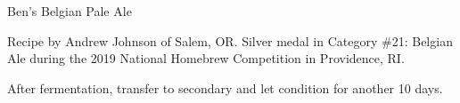 \stylesection{\stylebelgianpaleale}

\begin{recipe}{Ben's Belgian Pale Ale}

\begin{aboutblock}
Recipe by Andrew Johnson of Salem, OR. Silver medal in Category \#21: Belgian
Ale during the 2019 National Homebrew Competition in Providence, RI. \sourceaha
\end{aboutblock}


\begin{methodandtiming}
 
\begin{mashsteps}
\end{mashsteps}

\begin{fermentationsteps}
\end{fermentationsteps}

\begin{directions}
After fermentation, transfer to secondary and let condition for another
10 days.
\end{directions}

\end{methodandtiming}

\recipebreak

\begin{ingredientsblock}

\begin{malts}
\end{malts}

\begin{hops}
\end{hops}


\end{ingredientsblock}

\end{recipe}
